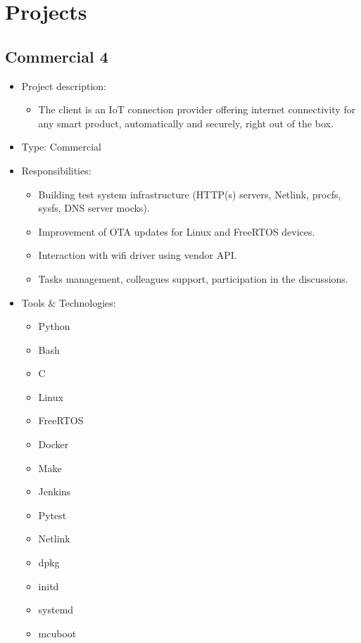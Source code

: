 \section{Projects}

\subsection{Commercial 4}
\begin{itemize}
    \item Project description:
    \begin{itemize}
        \item The client is an IoT connection provider offering internet connectivity for any smart product,
              automatically and securely, right out of the box.
    \end{itemize}
    \item Type: Commercial
    \item Responsibilities:
    \begin{itemize}
        \item Building test system infrastructure
              (HTTP(s) servers, Netlink, procfs, sysfs, DNS server mocks).
        \item Improvement of OTA updates for Linux and FreeRTOS devices.
        \item Interaction with wifi driver using vendor API.
        \item Tasks management, colleagues support, participation in the discussions.
    \end{itemize}
    \item Tools \& Technologies:
    \begin{itemize}
        \item Python
        \item Bash
        \item C
        \item Linux
        \item FreeRTOS
        \item Docker
        \item Make
        \item Jenkins
        \item Pytest
        \item Netlink
        \item dpkg
        \item initd
        \item systemd
        \item mcuboot
    \end{itemize}
\end{itemize}

